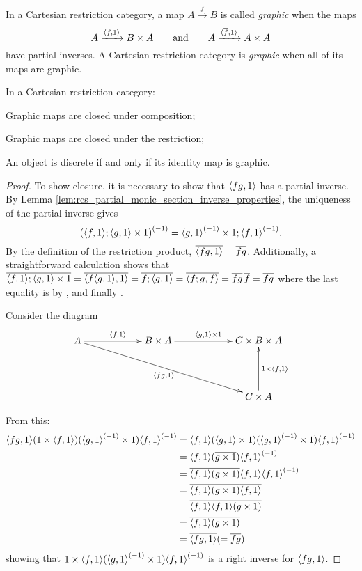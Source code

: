In a Cartesian restriction category, a map $A\xrightarrow{f}B$ is
called \emph{graphic} when the maps
\[
A\xrightarrow{\langle f,1\rangle}B\times A\qquad \text{and}\qquad
A\xrightarrow{\langle\overline{f},1\rangle}A\times A
\]
have partial inverses.
 A Cartesian restriction category is \emph{graphic} when all of its maps
are graphic.
\begin{lemma}\label{lem:graphic_maps_are_closed_in_a_cartesian_restriction_category}
In a Cartesian restriction category:
\bproofenum
\item Graphic maps are closed under composition;
\item Graphic maps are closed under the restriction;
\item An object is discrete if and only if its identity map is graphic.
\eproofenum
\end{lemma}
\begin{proof}
\bproofenum
\item To show closure, it is necessary to show that $\langle f g,1\rangle$ has a partial inverse.
By Lemma \ref{lem:rcs_partial_monic_section_inverse_properties}, the uniqueness of the partial inverse gives
\[{(\langle f,1\rangle ; \langle g,1\rangle\times 1)}^{(-1)} = {\langle g,1\rangle}^{(-1)} \times 1 ; {\langle f,1\rangle}^{(-1)} .\]
 By the definition of the restriction product, $\overline{\langle f g,1\rangle} = \overline{f g}$. Additionally,
a straightforward calculation shows that $\overline{\langle f,1\rangle;\langle g,1\rangle \times 1} = \overline{\langle f\langle g,1\rangle, 1\rangle} = \overline{f ;\langle g,1\rangle}
= \overline{\langle f;g, f\rangle} = \overline{f g}\,\overline{f} = \overline{f g}$ where the last equality is by \rtwo, \rthree and finally \rone.

Consider the diagram
\[
\xymatrix @C+35pt @R+20pt{
A \ar[r]^{\<f,1\>} \ar[drr]_{\<f g,1\>} &
   B \times A  \ar[r]^{\<g,1\> \times 1}
   &  C \times B \times A \\
&&C \times A \ar[u]_{1 \times \<f,1\>}
}
\]

From this:
\begin{align*}
\langle f g,1\rangle  (1\times \langle f,1\rangle) ( {\langle g,1\rangle}^{(-1)}\times 1) {\langle f,1\rangle}^{(-1)}
&=\langle f,1\rangle(\langle g,1\rangle\times 1 ) ({\langle g,1\rangle}^{(-1)}\times 1) {\langle f,1\rangle}^{(-1)}\\
&=\langle f,1\rangle (\overline{g\times 1}) {\langle f,1\rangle}^{(-1)}\\
&=\overline{\langle f,1\rangle (g\times 1)}  \langle f,1\rangle {\langle f,1\rangle}^{(-1)}\\
&=\overline{\langle f,1\rangle (g\times 1)}  \overline{\langle f,1\rangle}\\
&= \overline{\langle f,1\rangle} \overline{\langle f,1\rangle(g\times 1)}\\
&= \overline{\langle f,1\rangle (g\times 1)}\\
&= \overline{\langle f g,1\rangle}(=\overline{f g})\\
\end{align*}
showing that $1\times \langle f,1\rangle  ({\langle g,1\rangle}^{(-1)}\times 1 ) {\langle f,1\rangle}^{(-1)}$ is
 a right inverse for $\langle f g,1\rangle$.


\end{proof}
